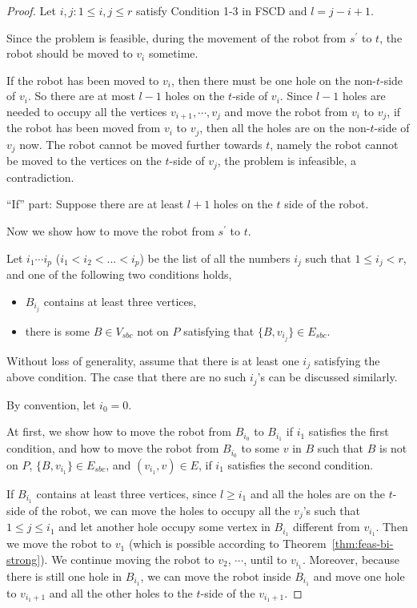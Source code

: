 \documentclass{article}
\begin{document}
\begin{proof}
Let $i,j: 1 \le i,j \le r$ satisfy Condition 1-3 in FSCD and
$l=j-i+1$.

Since the problem is feasible, during the movement of the robot from
$s^\prime$ to $t$, the robot should be moved to $v_i$ sometime.

If the robot has been moved to $v_i$, then there must be one hole on
the non-$t$-side of $v_i$. So there are at most $l-1$ holes on the
$t$-side of $v_i$. Since $l-1$ holes are needed to occupy all the
vertices $v_{i+1},\cdots,v_j$ and move the robot from $v_i$ to
$v_j$, if the robot has been moved from $v_i$ to $v_j$, then all the
holes are on the non-$t$-side of $v_j$ now. The robot cannot be
moved further towards $t$, namely the robot cannot be moved to the
vertices on the $t$-side of $v_j$, the problem is infeasible, a
contradiction.

``If'' part: Suppose there are at least $l+1$ holes on the $t$ side
of the robot.

Now we show how to move the robot from $s^\prime$ to $t$.

Let $i_1\cdots i_p$ ($i_1 < i_2 < ... < i_p$) be the list of all the
numbers $i_j$ such that $1 \le i_j < r$, and one of the following
two conditions holds,
\begin{itemize}
\item $B_{i_j}$ contains at least three vertices,

\item there is some $B \in V_{sbc}$ not on $P$ satisfying that $\{B, v_{i_j}\} \in
E_{sbc}$.
\end{itemize}

Without loss of generality, assume that there is at least one $i_j$
satisfying the above condition. The case that there are no such
$i_j$'s can be discussed similarly.

By convention, let $i_0=0$.

At first, we show how to move the robot from $B_{i_0}$ to $B_{i_1}$
if $i_1$ satisfies the first condition, and how to move the robot
from $B_{i_0}$ to some $v$ in $B$ such that $B$ is not on $P$,
$\{B,v_{i_1}\} \in E_{sbc}$, and $(v_{i_1},v) \in E$, if $i_1$
satisfies the second condition.

If $B_{i_1}$ contains at least three vertices, since $l \ge i_1$ and
all the holes are on the $t$-side of the robot, we can move the
holes to occupy all the $v_j$'s such that $1 \le j \le i_1$ and let
another hole occupy some vertex in $B_{i_1}$ different from
$v_{i_1}$. Then we move the robot to $v_1$ (which is possible
according to Theorem~\ref{thm:feas-bi-strong}). We continue moving
the robot to $v_2$, $\cdots$, until to $v_{i_1}$. Moreover, because
there is still one hole in $B_{i_1}$, we can move the robot inside
$B_{i_1}$ and move one hole to $v_{i_1+1}$ and all the other holes
to the $t$-side of the $v_{i_1+1}$.


\end{proof}
\end{document}
